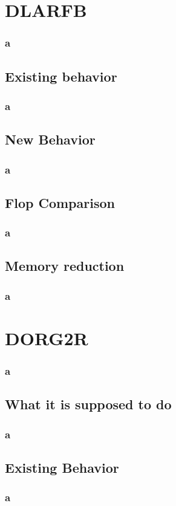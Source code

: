 \documentclass[12pt]{beamer}
\begin{document}
    \section{DLARFB}
    \begin{frame}
        \frametitle{a}
    \end{frame}
    \subsection{Existing behavior}
    \begin{frame}
        \frametitle{a}
    \end{frame}
    \subsection{New Behavior}
    \begin{frame}
        \frametitle{a}
    \end{frame}
    \subsection{Flop Comparison}
    \begin{frame}
        \frametitle{a}
    \end{frame}
    \subsection{Memory reduction}
    \begin{frame}
        \frametitle{a}
    \end{frame}
    \section{DORG2R}
    \begin{frame}
        \frametitle{a}
    \end{frame}
    \subsection{What it is supposed to do}
    \begin{frame}
        \frametitle{a}
    \end{frame}
    \subsection{Existing Behavior}
    \begin{frame}
        \frametitle{a}
    \end{frame}
\end{document}
